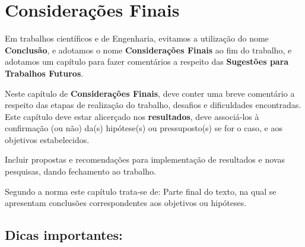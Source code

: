 % 
%
\chapter{Considerações Finais}

    Em trabalhos científicos e de Engenharia, evitamos a utilização do nome {\bf Conclusão}, e adotamos o nome {\bf Considerações Finais} ao fim do trabalho, e adotamos um capítulo para fazer comentários a respeito das {\bf Sugestões para Trabalhos Futuros}.

    Neste capítulo de {\bf Considerações Finais}, deve conter uma breve comentário a respeito das etapas de realização do trabalho, desafios e dificuldades encontradas.    
    Este capítulo deve estar alicerçado nos {\bf resultados}, deve associá-los à confirmação (ou não) da(s) hipótese(s) ou pressuposto(s) se for o caso, e aos objetivos estabelecidos.

    Incluir propostas e recomendações para implementação de resultados e novas pesquisas, dando fechamento ao trabalho.
    
    Segundo a norma \cite{NBR14724_TrabalhosAcademicos} este capítulo trata-se de: Parte final do texto, na qual se apresentam conclusões correspondentes aos objetivos ou hipóteses. 

\section{Dicas importantes:}
    
